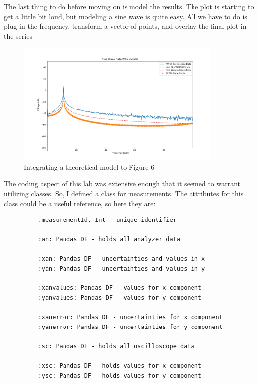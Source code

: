 \documentclass{article}
\begin{document}
The last thing to do before moving on is model the results. The plot is
starting to get a little bit loud, but modeling a sine wave is quite easy. All
we have to do is plug in the frequency, transform a vector of points, and
overlay the final plot in the series
\begin{figure}[H]
    \centering
\begin{minipage}{11cm}
\begin{tcolorbox}
        \includegraphics[width=10cm, height=6cm]{figures/figure7.png}
        \caption{Integrating a theoretical model to Figure 6}
        \label{fig:fig7}
\end{tcolorbox}
\end{minipage}
\end{figure}

The coding aspect of this lab was extensive enough that it seemed
to warrant utilizing classes. So, I defined a class for measurements. The
attributes for this class could be a useful reference, so here they are: 

\begin{figure}[H]
\centering
\begin{minipage}{1\textwidth}
\begin{tcolorbox}
\begin{verbatim}
    :measurementId: Int - unique identifier 

    :an: Pandas DF - holds all analyzer data

    :xan: Pandas DF - uncertainties and values in x
    :yan: Pandas DF - uncertainties and values in y

    :xanvalues: Pandas DF - values for x component
    :yanvalues: Pandas DF - values for y component

    :xanerror: Pandas DF - uncertainties for x component
    :yanerror: Pandas DF - uncertainties for y component

    :sc: Pandas DF - holds all oscilloscope data

    :xsc: Pandas DF - holds values for x component
    :ysc: Pandas DF - holds values for y component
\end{verbatim}
\end{tcolorbox}
\end{minipage}
\end{figure}
\end{document}
